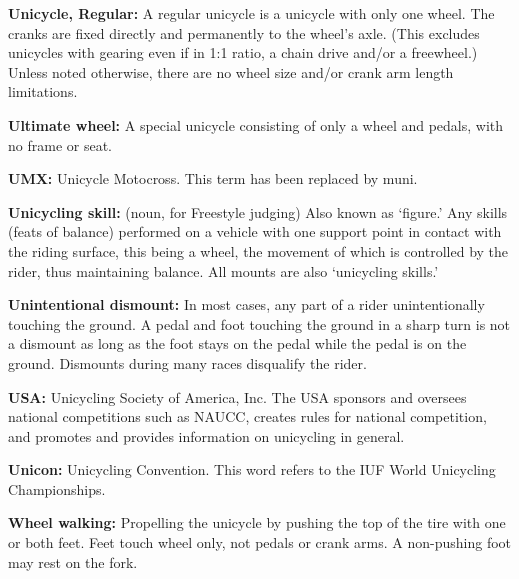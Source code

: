 \textbf{Unicycle, Regular:} A regular unicycle is a unicycle with only one wheel.
The cranks are fixed directly and permanently to the wheel's axle.
(This excludes unicycles with gearing even if in 1:1 ratio, a chain drive and/or a freewheel.)
Unless noted otherwise, there are no wheel size and/or crank arm length limitations.

\textbf{Ultimate wheel:} A special unicycle consisting of only a wheel and pedals, with no frame or seat.

\textbf{UMX:} Unicycle Motocross.
This term has been replaced by muni.

\textbf{Unicycling skill:} (noun, for Freestyle judging) Also known as `figure.' Any skills (feats of balance) performed on a vehicle with one support point in contact with the riding surface, this being a wheel, the movement of which is controlled by the rider, thus maintaining balance.
All mounts are also `unicycling skills.'

\textbf{Unintentional dismount:} In most cases, any part of a rider unintentionally touching the ground.
A pedal and foot touching the ground in a sharp turn is not a dismount as long as the foot stays on the pedal while the pedal is on the ground.
Dismounts during many races disqualify the rider.

\textbf{USA:} Unicycling Society of America, Inc.
The USA sponsors and oversees national competitions such as NAUCC, creates rules for national competition, and promotes and provides information on unicycling in general.

\textbf{Unicon:} Unicycling Convention.
This word refers to the IUF World Unicycling Championships.

\textbf{Wheel walking:} Propelling the unicycle by pushing the top of the tire with one or both feet.
Feet touch wheel only, not pedals or crank arms.
A non-pushing foot may rest on the fork.

